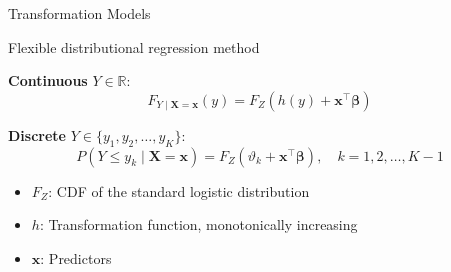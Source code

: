 \documentclass[onlytextwidth,english]{beamer}\usepackage[]{graphicx}\usepackage[]{xcolor}
\begin{document}
\begin{frame}{Transformation Models}

Flexible distributional regression method \citep{hothorn2014}

\vspace{0.4cm}

\textbf{Continuous } $Y \in \mathbb{R}$: 
\[
F_{Y \mid \mathbf{X} = \mathbf{x}}(y) = F_Z(h(y) + \mathbf{x}^\top \boldsymbol{\beta})
\]

\textbf{Discrete } $Y \in \{y_1, y_2, \ldots, y_K\}$: 
\[
P(Y \leq y_k \mid \mathbf{X} = \mathbf{x}) = F_Z(\vartheta_k + \mathbf{x}^\top \boldsymbol{\beta}), \quad k = 1, 2, \ldots, K - 1
\]

\vspace{0.4cm}

\begin{itemize}
    \item $F_Z$: CDF of the standard logistic distribution
    \item $h$: Transformation function, monotonically increasing
    \item $\mathbf{x}$: Predictors
\end{itemize}

\end{frame}
\end{document}
